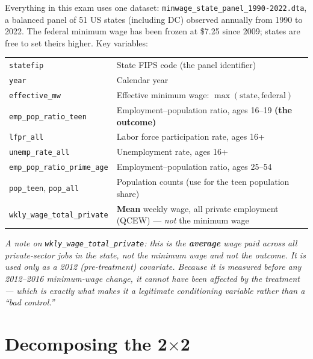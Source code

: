 \documentclass[11pt,a4paper]{article}
\newcommand{\code}[1]{\texttt{\color{ChiantiRed}#1}}
\begin{document}
\begin{databox}
Everything in this exam uses one dataset: \code{minwage\_state\_panel\_1990-2022.dta}, a balanced panel of 51 US states (including DC) observed annually from 1990 to 2022. The federal minimum wage has been frozen at \$7.25 since 2009; states are free to set theirs higher. Key variables:

\medskip
\begin{center}
\small
\begin{tabular}{@{}l>{\raggedright\arraybackslash}p{}@{}}
\toprule
\code{statefip} & State FIPS code (the panel identifier) \\
\code{year} & Calendar year \\
\code{effective\_mw} & Effective minimum wage: $\max(\text{state}, \text{federal})$ \\
\code{emp\_pop\_ratio\_teen} & Employment--population ratio, ages 16--19 \textbf{(the outcome)} \\
\code{lfpr\_all} & Labor force participation rate, ages 16+ \\
\code{unemp\_rate\_all} & Unemployment rate, ages 16+ \\
\code{emp\_pop\_ratio\_prime\_age} & Employment--population ratio, ages 25--54 \\
\code{pop\_teen}, \code{pop\_all} & Population counts (use for the teen population share) \\
\code{wkly\_wage\_total\_private} & \textbf{Mean} weekly wage, all private employment (QCEW) --- \emph{not} the minimum wage \\
\bottomrule
\end{tabular}
\end{center}
\smallskip
\footnotesize\textit{A note on \code{wkly\_wage\_total\_private}: this is the \textbf{average} wage paid across all private-sector jobs in the state, not the minimum wage and not the outcome. It is used only as a 2012 (pre-treatment) covariate. Because it is measured before any 2012--2016 minimum-wage change, it cannot have been affected by the treatment --- which is exactly what makes it a legitimate conditioning variable rather than a ``bad control.''}
\end{databox}

\section{Decomposing the 2$\times$2}
\end{document}
